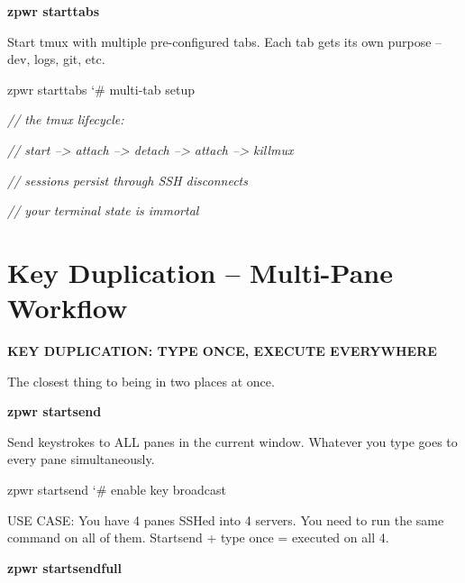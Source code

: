 \documentclass[11pt,a4paper,twoside]{book}
\begin{document}
\vspace{12pt}
{\bfseries\color{neonyellow} zpwr starttabs}\vspace{4pt}

Start tmux with multiple pre-configured tabs. Each tab gets its own purpose -- dev, logs, git, etc.

\begin{codebox}
\color{neongreen}zpwr starttabs              {\char`\#} multi-tab setup\\
\end{codebox}

{\small\itshape\color{dimtext} // the tmux lifecycle:}

{\small\itshape\color{dimtext} //   start --> attach --> detach --> attach --> killmux}

{\small\itshape\color{dimtext} //   sessions persist through SSH disconnects}

{\small\itshape\color{dimtext} //   your terminal state is immortal}


\vspace{16pt}

\section{Key Duplication -- Multi-Pane Workflow}


\vspace{10pt}
{\large\bfseries\color{neoncyan} KEY DUPLICATION: TYPE ONCE, EXECUTE EVERYWHERE}\vspace{6pt}

The closest thing to being in two places at once.


\vspace{12pt}
{\bfseries\color{neonyellow} zpwr startsend}\vspace{4pt}

Send keystrokes to ALL panes in the current window. Whatever you type goes to every pane simultaneously.

\begin{codebox}
\color{neongreen}zpwr startsend              {\char`\#} enable key broadcast\\
\end{codebox}

USE CASE: You have 4 panes SSHed into 4 servers. You need to run the same command on all of them. Startsend + type once = executed on all 4.


\vspace{12pt}
{\bfseries\color{neonyellow} zpwr startsendfull}\vspace{4pt}
\end{document}
